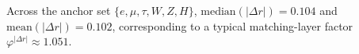 Across the anchor set $\{e,\mu,\tau,W,Z,H\}$, $\mathrm{median}(|\Delta r|)=0.104$ and $\mathrm{mean}(|\Delta r|)=0.102$, corresponding to a typical matching-layer factor $\varphi^{|\Delta r|}\approx 1.051$.